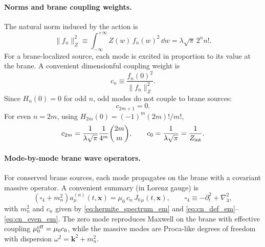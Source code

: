 \documentclass[11pt]{article}
\newcommand{\x}{\mathbf{x}}     %
\newcommand{\lapthree}{\nabla_3^2}
\newcommand{\J}{J}              %
\newcommand{\Z}{Z}              %
\newcommand{\muzero}{\mu_0}
\newcommand{\muzeff}{\mu_0^{\rm eff}}
\newcommand{\Zint}{Z_{\rm int}}
\begin{document}
\paragraph{Norms and brane coupling weights.}
The natural norm induced by the action is
\begin{equation}
\|f_n\|_{\Z}^2 \equiv \int_{-\infty}^{+\infty}\Z(w)\,f_n(w)^2\,\dd w
=\lambda\sqrt{\pi}\,2^n n!.
\label{eq:hermite_norm_em}
\end{equation}
For a brane-localized source, each mode is excited in proportion to its value at
the brane. A convenient dimensionful coupling weight is
\begin{equation}
c_n \equiv \frac{f_n(0)^2}{\|f_n\|_{\Z}^2}.
\label{eq:cn_def_em}
\end{equation}
Since \(H_n(0)=0\) for odd \(n\), odd modes do not couple to brane sources:
\begin{equation}
c_{2m+1}=0.
\label{eq:odd_vanish_em}
\end{equation}
For even \(n=2m\), using \(H_{2m}(0)=(-1)^m(2m)!/m!\),
\begin{equation}
c_{2m}
=\frac{1}{\lambda\sqrt{\pi}}\frac{1}{4^m}\binom{2m}{m},
\qquad
c_0=\frac{1}{\lambda\sqrt{\pi}}=\frac{1}{\Zint}.
\label{eq:cn_even_em}
\end{equation}

\paragraph{Mode-by-mode brane wave operators.}
For conserved brane sources, each mode propagates on the brane with a covariant
massive operator. A convenient summary (in Lorenz gauge) is
\begin{equation}
\left(\square_4 + m_n^2\right)a^{(n)}_\mu(t,\x)
=\muzero\,c_n\,\J_{b\,\mu}(t,\x),
\qquad
\square_4 \equiv -\partial_t^2+\lapthree,
\label{eq:mode_wave_eq_em}
\end{equation}
with \(m_n^2\) and \(c_n\) given by \eqref{eq:hermite_spectrum_em} and
\eqref{eq:cn_def_em}--\eqref{eq:cn_even_em}. The zero mode reproduces Maxwell on the
brane with effective coupling \(\muzeff=\muzero c_0\), while the massive modes are
Proca-like degrees of freedom with dispersion \(\omega^2=\mathbf{k}^2+m_n^2\).
\end{document}
